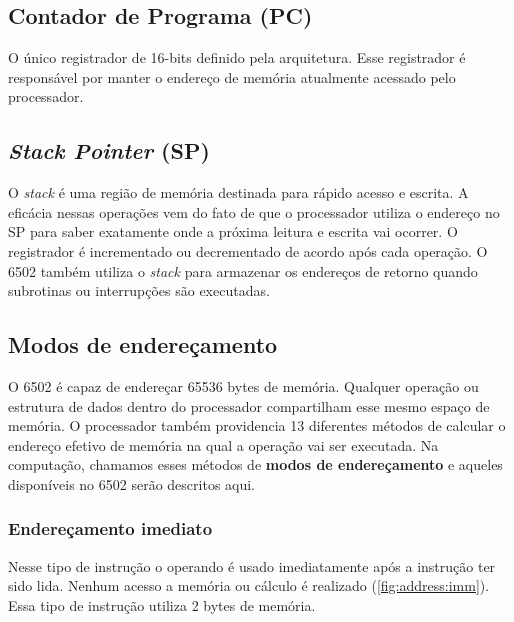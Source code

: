 \documentclass[
	12pt,				  %
	openright,		%
	a4paper,			%
	english,			%
	french,				%
	spanish,			%
	brazil,				%
]{abntex2}
\begin{document}
\subsection{Contador de Programa (PC)}
O único registrador de 16-bits definido pela arquitetura. Esse registrador é
responsável por manter o endereço de memória atualmente acessado pelo
processador.

\subsection{\emph{Stack Pointer} (SP)}
O \emph{stack} é uma região de memória destinada para rápido acesso e escrita.
A eficácia nessas operações vem do fato de que o processador utiliza o endereço
no SP para saber exatamente onde a próxima leitura e escrita vai ocorrer.
O registrador é incrementado ou decrementado de acordo após cada operação. O
6502 também utiliza o \emph{stack} para armazenar os endereços de retorno quando
subrotinas ou interrupções são executadas.

\subsection{Modos de endereçamento}
O 6502 é capaz de endereçar 65536 bytes de memória. Qualquer operação ou
estrutura de dados dentro do processador compartilham esse mesmo espaço de
memória. O processador também providencia 13 diferentes métodos de calcular o
endereço efetivo de memória na qual a operação vai ser executada. Na computação,
chamamos esses métodos de \textbf{modos de endereçamento} e aqueles disponíveis
no 6502 serão descritos aqui.

\subsubsection{Endereçamento imediato}
Nesse tipo de instrução o operando é usado imediatamente após a instrução ter
sido lida. Nenhum acesso a memória ou cálculo é realizado
(\autoref{fig:address:imm}). Essa tipo de instrução utiliza 2 bytes de memória.
\end{document}
